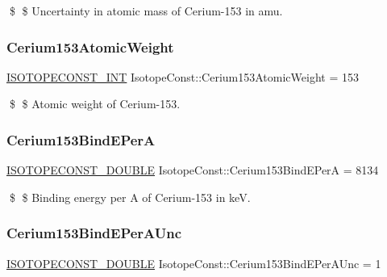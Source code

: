 \$ \$ Uncertainty in atomic mass of Cerium-\/153 in amu. \mbox{\label{group___isotope_const-_cerium-_ce153_gaa2d6578f046146213e4eaa68e8599ad2}} 
\subsubsection{\texorpdfstring{Cerium153\+Atomic\+Weight}{Cerium153AtomicWeight}}
{\footnotesize\ttfamily \mbox{\hyperlink{group___isotope_const-_macros_ga5f18360b3e99483a35c32d789e62621c}{I\+S\+O\+T\+O\+P\+E\+C\+O\+N\+S\+T\+\_\+\+I\+NT}} Isotope\+Const\+::\+Cerium153\+Atomic\+Weight = 153}

\$ \$ Atomic weight of Cerium-\/153. \mbox{\label{group___isotope_const-_cerium-_ce153_ga22c4b0d62e35a509598f415d304a611d}} 
\subsubsection{\texorpdfstring{Cerium153\+Bind\+E\+PerA}{Cerium153BindEPerA}}
{\footnotesize\ttfamily \mbox{\hyperlink{group___isotope_const-_macros_ga8f45a7272ce02c0b4c65c44636ed719a}{I\+S\+O\+T\+O\+P\+E\+C\+O\+N\+S\+T\+\_\+\+D\+O\+U\+B\+LE}} Isotope\+Const\+::\+Cerium153\+Bind\+E\+PerA = 8134}

\$ \$ Binding energy per A of Cerium-\/153 in keV. \mbox{\label{group___isotope_const-_cerium-_ce153_ga3d965c481e4748752354e7b25b18a234}} 
\subsubsection{\texorpdfstring{Cerium153\+Bind\+E\+Per\+A\+Unc}{Cerium153BindEPerAUnc}}
{\footnotesize\ttfamily \mbox{\hyperlink{group___isotope_const-_macros_ga8f45a7272ce02c0b4c65c44636ed719a}{I\+S\+O\+T\+O\+P\+E\+C\+O\+N\+S\+T\+\_\+\+D\+O\+U\+B\+LE}} Isotope\+Const\+::\+Cerium153\+Bind\+E\+Per\+A\+Unc = 1}

